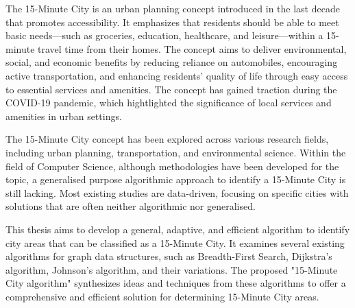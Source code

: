 \begin{Abstract}
\begin{changemargin}{1cm}{1cm}

The 15-Minute City is an urban planning concept introduced in the last decade that promotes accessibility. It emphasizes that residents should be able to meet basic needs—such as groceries, education, healthcare, and leisure—within a 15-minute travel time from their homes. The concept aims to deliver environmental, social, and economic benefits by reducing reliance on automobiles, encouraging active transportation, and enhancing residents' quality of life through easy access to essential services and amenities. The concept has gained traction during the COVID-19 pandemic, which hightlighted the significance of local services and amenities in urban settings.

\vspace{0.5cm}

The 15-Minute City concept has been explored across various research fields, including urban planning, transportation, and environmental science. Within the field of Computer Science, although methodologies have been developed for the topic, a generalised purpose algorithmic approach to identify a 15-Minute City is still lacking. Most existing studies are data-driven, focusing on specific cities with solutions that are often neither algorithmic nor generalised.

\vspace{0.5cm}

This thesis aims to develop a general, adaptive, and efficient algorithm to identify city areas that can be classified as a 15-Minute City. It examines several existing algorithms for graph data structures, such as Breadth-First Search, Dijkstra's algorithm, Johnson's algorithm, and their variations. The proposed "15-Minute City algorithm" synthesizes ideas and techniques from these algorithms to offer a comprehensive and efficient solution for determining 15-Minute City areas.

\end{changemargin}
\end{Abstract}